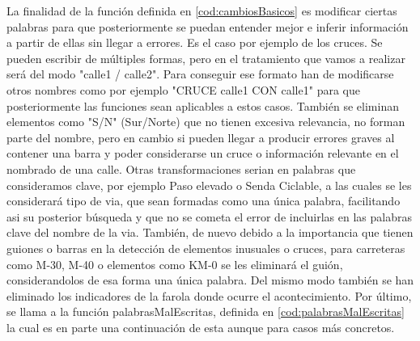 




La finalidad de la función definida en \ref{cod:cambiosBasicos} es modificar ciertas palabras para que posteriormente se puedan entender mejor e inferir información a partir de ellas sin llegar a errores.
\newline
Es el caso por ejemplo de los cruces. Se pueden escribir de múltiples formas, pero en el tratamiento que vamos a realizar será del modo "calle1 / calle2". Para conseguir ese formato han de modificarse otros nombres como por ejemplo "CRUCE calle1 CON calle1" para que posteriormente las funciones sean aplicables a estos casos.
\newline
También se eliminan elementos como "S/N" (Sur/Norte) que no tienen excesiva relevancia, no forman parte del nombre, pero en cambio si pueden llegar a producir errores graves al contener una barra y poder considerarse un cruce o información relevante en el nombrado de una calle.
\newline
Otras transformaciones serian en palabras que consideramos clave, por ejemplo Paso elevado o Senda Ciclable, a las cuales se les considerará tipo de via, que sean formadas como una única palabra, facilitando asi su posterior búsqueda y que no se cometa el error de incluirlas en las palabras clave del nombre de la via.
\newline
También, de nuevo debido a la importancia que tienen guiones o barras en la detección de elementos inusuales o cruces, para carreteras como M-30, M-40 o elementos como KM-0 se les eliminará el guión, considerandolos de esa forma una única palabra. Del mismo modo también se han eliminado los indicadores de la farola donde ocurre el acontecimiento. 
\newline
Por último, se llama a la función palabrasMalEscritas, definida en \ref{cod:palabrasMalEscritas} la cual es en parte una continuación de esta aunque para casos más concretos.

\clearpage


